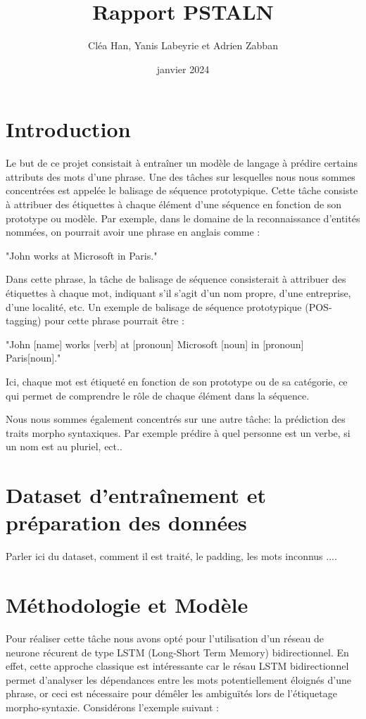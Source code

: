 \documentclass[a4paper]{article}
\title{Rapport PSTALN}
\author{Cléa Han, Yanis Labeyrie et Adrien Zabban}
\date{janvier 2024}
\begin{document}
\maketitle

\section{Introduction}

Le but de ce projet consistait à entraîner un modèle de langage à prédire certains attributs des mots d'une phrase. Une des tâches sur lesquelles nous nous sommes concentrées est appelée le balisage de séquence prototypique. Cette tâche consiste à attribuer des étiquettes à chaque élément d'une séquence en fonction de son prototype ou modèle. Par exemple, dans le domaine de la reconnaissance d'entités nommées, on pourrait avoir une phrase en anglais comme :

"John works at Microsoft in Paris."

Dans cette phrase, la tâche de balisage de séquence consisterait à attribuer des étiquettes à chaque mot, indiquant s'il s'agit d'un nom propre, d'une entreprise, d'une localité, etc. Un exemple de balisage de séquence prototypique (POS-tagging) pour cette phrase pourrait être :

"John [name] works [verb] at [pronoun] Microsoft [noun] in [pronoun] Paris[noun]."

Ici, chaque mot est étiqueté en fonction de son prototype ou de sa catégorie, ce qui permet de comprendre le rôle de chaque élément dans la séquence. 

Nous nous sommes également concentrés sur une autre tâche: la prédiction des traits morpho syntaxiques. Par exemple prédire à quel personne est un verbe, si un nom est au pluriel, ect..


\section{Dataset d'entraînement et préparation des données}

Parler ici du dataset, comment il est traité, le padding, les mots inconnus ....


\section{Méthodologie et Modèle}

Pour réaliser cette tâche nous avons opté pour l'utilisation d'un réseau de neurone récurent de type LSTM (Long-Short Term Memory) bidirectionnel. En effet, cette approche classique est intéressante car le résau LSTM bidirectionnel permet d'analyser les dépendances entre les mots potentiellement éloignés d'une phrase, or ceci est nécessaire pour démêler les ambiguïtés lors de l'étiquetage morpho-syntaxie. Considérons l'exemple suivant :
\end{document}

